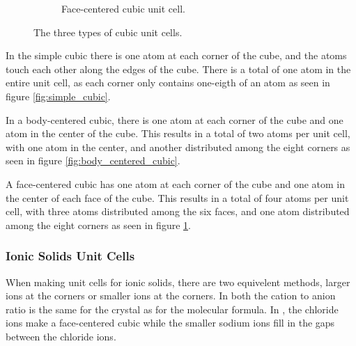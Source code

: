 \begin{figure}[ht]
\begin{subfigure}{0.3\textwidth}
        \caption{Face-centered cubic unit cell.}
        \label{fig:face_centered_cubic}
    \end{subfigure}
    \caption{The three types of cubic unit cells.}
    \label{fig:cubic_unit_cells}
\end{figure}
In the simple cubic there is one atom at each corner of the cube, and the atoms touch each other along the edges of the cube. There is a total of one atom in the entire unit cell, as each corner only contains one-eigth of an atom as seen in figure \ref{fig:simple_cubic}.

In a body-centered cubic, there is one atom at each corner of the cube and one atom in the center of the cube. This results in a total of two atoms per unit cell, with one atom in the center, and another distributed among the eight corners as seen in figure \ref{fig:body_centered_cubic}.

A face-centered cubic has one atom at each corner of the cube and one atom in the center of each face of the cube. This results in a total of four atoms per unit cell, with three atoms distributed among the six faces, and one atom distributed among the eight corners as seen in figure \ref{fig:face_centered_cubic}.
\subsubsection{Ionic Solids Unit Cells}
When making unit cells for ionic solids, there are two equivelent methods, larger ions at the corners or smaller ions at the corners. In both the cation to anion ratio is the same for the crystal as for the molecular formula. In , the chloride ions make a face-centered cubic while the smaller sodium ions fill in the gaps between the chloride ions. 
